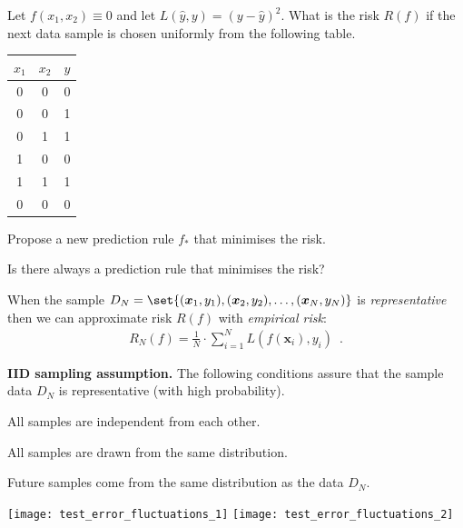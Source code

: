 \documentclass[landscape,footrule]{foils}
\renewcommand{\vec}[1]{\boldsymbol{#1}}
\begin{document}
\begin{triangles}
\item Let $f(x_1,x_2)\equiv 0$ and let $L(\hat{y}, y)= (y-\hat{y})^2$. What is the risk $R(f)$ if the next data sample is chosen uniformly from the following table.
\bigskip

\begin{center}
\begin{tabular}{|c|c|c|}
\hline
$x_1$ & $x_2$ & $y$\\ 
\hline
0 & 0 & 0\\
0 & 0 & 1\\
0 & 1 & 1\\
1 & 0 & 0\\
1 & 1 & 1\\
0 & 0 & 0\\
\hline
\end{tabular}
\bigskip

\end{center}
\item Propose a new prediction rule $f_*$ that minimises the risk. 
\item Is there always a prediction rule that minimises the risk?
\end{triangles}


When the sample $D_N=\set{(\vec{x}_1,y_1),(\vec{x}_2,y_2),\ldots, (\vec{x}_N, y_N)}$ is \emph{representative} then we can approximate risk $R(f)$ with \emph{empirical risk}:
\begin{align*}
  R_N(f)=\frac{1}{N}\cdot\sum_{i=1}^N L(f(\vec{x}_i), y_i)\enspace.
\end{align*} 
\hspace*{1cm}

\textbf{IID sampling assumption.} The following conditions assure that the sample data $D_N$ is representative (with high probability).
\begin{triangles}
\item All samples are independent from each other. 
\item All samples are drawn from the same distribution.
\item Future samples come from the same distribution as the data $D_N$.
\end{triangles}

\enlargethispage{1cm}
\centerline{
\texttt{[image: test\_error\_fluctuations\_1]}\hspace*{0.5cm}
\texttt{[image: test\_error\_fluctuations\_2]}}
\end{document}
